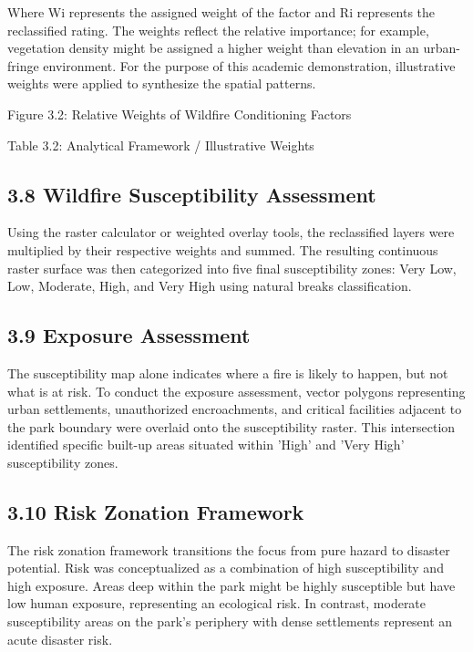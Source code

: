 \documentclass[12pt,a4paper]{article}
\begin{document}
Where Wi represents the assigned weight of the factor and Ri represents the reclassified rating. The weights reflect the relative importance; for example, vegetation density might be assigned a higher weight than elevation in an urban-fringe environment. For the purpose of this academic demonstration, illustrative weights were applied to synthesize the spatial patterns.


Figure 3.2: Relative Weights of Wildfire Conditioning Factors


Table 3.2: Analytical Framework / Illustrative Weights



\subsection*{3.8 Wildfire Susceptibility Assessment}

Using the raster calculator or weighted overlay tools, the reclassified layers were multiplied by their respective weights and summed. The resulting continuous raster surface was then categorized into five final susceptibility zones: Very Low, Low, Moderate, High, and Very High using natural breaks classification.



\subsection*{3.9 Exposure Assessment}

The susceptibility map alone indicates where a fire is likely to happen, but not what is at risk. To conduct the exposure assessment, vector polygons representing urban settlements, unauthorized encroachments, and critical facilities adjacent to the park boundary were overlaid onto the susceptibility raster. This intersection identified specific built-up areas situated within 'High' and 'Very High' susceptibility zones.



\subsection*{3.10 Risk Zonation Framework}

The risk zonation framework transitions the focus from pure hazard to disaster potential. Risk was conceptualized as a combination of high susceptibility and high exposure. Areas deep within the park might be highly susceptible but have low human exposure, representing an ecological risk. In contrast, moderate susceptibility areas on the park's periphery with dense settlements represent an acute disaster risk.
\end{document}
